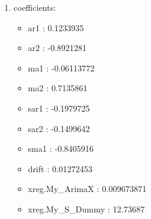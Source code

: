 \documentclass[10pt,a4paper]{article}\usepackage[]{graphicx}\usepackage[]{color}
\begin{document}
\begin{multicols}{2}
\begin{enumerate}
\item coefficients:
\begin{itemize}
\item  ar1 :  0.1233935 
\item  ar2 :  -0.8921281 
\item  ma1 :  -0.06113772 
\item  ma2 :  0.7135861 
\item  sar1 :  -0.1979725 
\item  sar2 :  -0.1499642 
\item  sma1 :  -0.8405916 
\item  drift :  0.01272453 
\item  xreg.My_ArimaX :  0.009673871 
\item  xreg.My_S_Dummy :  12.73687 
\end{itemize}
\end{enumerate}
\end{multicols}
\end{document}
